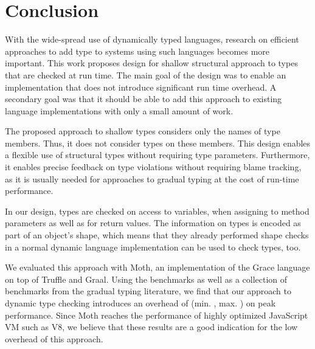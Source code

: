 
\section{Conclusion}
\label{sec:conclusion}

With the wide-spread use of dynamically typed languages,
research on efficient approaches to add type to systems using such languages
becomes more important.
%
This work proposes design for shallow structural approach to types
that are checked at run time.
The main goal of the design was to enable an implementation that
does not introduce significant run time overhead.
A secondary goal was that it should be able to add this approach to
existing language implementations with only a small amount of work.


The proposed approach to shallow types considers only the names of type members.
Thus, it does not consider types on these members.
This design enables a flexible use of structural types without requiring
type parameters.
Furthermore, it enables precise feedback on type violations
without requiring blame tracking,
as it is usually needed for approaches to gradual typing
at the cost of run-time performance.

In our design, types are checked on access to variables,
when assigning to method parameters as well as for return values.
The information on types is encoded as part of an object's shape,
which means that they already performed shape checks in a normal dynamic
language implementation can be used to check types, too.

We evaluated this approach with Moth, an implementation of the Grace language
on top of Truffle and Graal.
Using the \AWFY benchmarks as well as a collection of benchmarks from the
gradual typing literature, we find that our approach to dynamic type checking
introduces an overhead of 
\OverheadTypingGMeanP (min. \OverheadTypingMinP, max. \OverheadTypingMaxP)
on peak performance.
Since Moth reaches the performance of highly optimized JavaScript VM such as V8,
we believe that these results are a good indication for the low overhead of this
approach.


